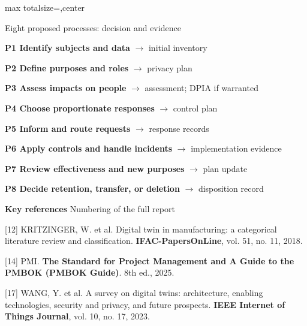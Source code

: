 \documentclass[12pt]{article}
\begin{document}
\begin{adjustbox}{max totalsize={\textwidth}{\textheight},center}
{%
\begin{caixa}{Eight proposed processes: decision and evidence}
\fontsize{12.5}{16}\selectfont\raggedright
\begin{minipage}[t]{0.48\linewidth}\vspace{0pt}
\textbf{P1 Identify subjects and data} $\rightarrow$ initial inventory\par\smallskip
\textbf{P2 Define purposes and roles} $\rightarrow$ privacy plan\par\smallskip
\textbf{P3 Assess impacts on people} $\rightarrow$ assessment; DPIA if warranted\par\smallskip
\textbf{P4 Choose proportionate responses} $\rightarrow$ control plan
\end{minipage}\hfill
\begin{minipage}[t]{0.48\linewidth}\vspace{0pt}
\textbf{P5 Inform and route requests} $\rightarrow$ response records\par\smallskip
\textbf{P6 Apply controls and handle incidents} $\rightarrow$ implementation evidence\par\smallskip
\textbf{P7 Review effectiveness and new purposes} $\rightarrow$ plan update\par\smallskip
\textbf{P8 Decide retention, transfer, or deletion} $\rightarrow$ disposition record
\end{minipage}
\end{caixa}

\vspace{5mm}

\begin{tcolorbox}[enhanced,colback=white,colframe=exLine,boxrule=0.45mm,arc=1.5mm,
  left=4mm,right=4mm,top=3mm,bottom=3mm]
{\fontsize{16}{20}\selectfont\bfseries\color{exLine} Key references}\hfill
{\fontsize{11}{14}\selectfont Numbering of the full report}\par\vspace{2mm}
{\fontsize{10.5}{13}\selectfont
\begin{minipage}[t]{0.31\linewidth}\vspace{0pt}
[12] KRITZINGER, W. et al. Digital twin in manufacturing: a categorical literature review and classification. \textbf{IFAC-PapersOnLine}, vol. 51, no. 11, 2018.
\end{minipage}\hfill
\begin{minipage}[t]{0.31\linewidth}\vspace{0pt}
[14] PMI. \textbf{The Standard for Project Management and A Guide to the PMBOK (PMBOK Guide)}. 8th ed., 2025.
\end{minipage}\hfill
\begin{minipage}[t]{0.31\linewidth}\vspace{0pt}
[17] WANG, Y. et al. A survey on digital twins: architecture, enabling technologies, security and privacy, and future prospects. \textbf{IEEE Internet of Things Journal}, vol. 10, no. 17, 2023.
\end{minipage}}
\end{tcolorbox}

}
\end{adjustbox}
\end{document}
